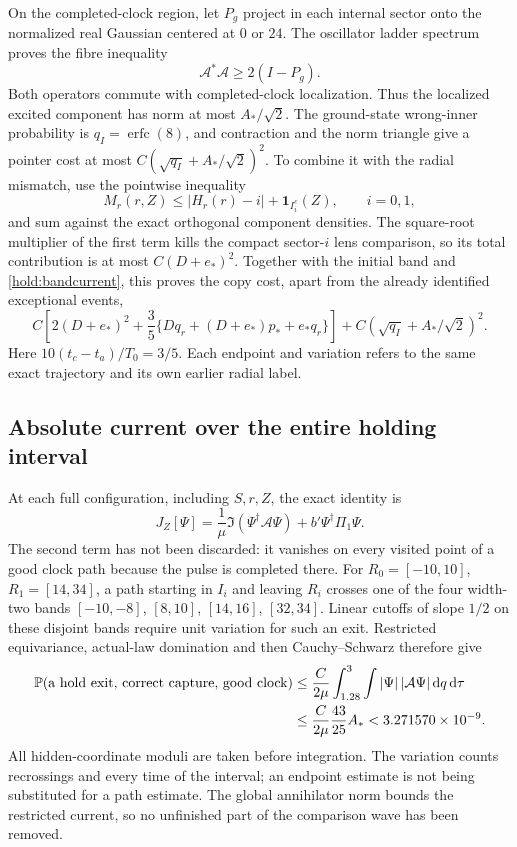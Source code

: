 \documentclass[11pt]{article}
\theoremstyle{definition}\newtheorem{definition}[theorem]{Definition}
\theoremstyle{remark}\newtheorem{remark}[theorem]{Remark}
\newcommand{\Prob}{\mathbb P}\newcommand{\E}{\mathbb E}
\newcommand{\one}{\mathbf1}\newcommand{\R}{\mathbb R}\newcommand{\T}{\mathbb T}
\newcommand{\dd}{\,\mathrm d}\newcommand{\Imv}{\operatorname{Im}}\newcommand{\ii}{\mathrm i}
\begin{document}
On the completed-clock region, let $P_g$ project in each internal
sector onto the normalized real Gaussian centered at $0$ or $24$.
The oscillator ladder spectrum proves the fibre inequality
\begin{equation}\label{hold:gap}
 \mathcal A^*\mathcal A\geq2(I-P_g).
\end{equation}
Both operators commute with completed-clock localization.  Thus the
localized excited component has norm at most $A_*/\sqrt2$.
The ground-state wrong-inner probability is $q_I=\operatorname{erfc}(8)$,
and contraction and the norm triangle give a pointer cost at most
$C(\sqrt{q_I}+A_*/\sqrt2)^2$.
To combine it with the radial mismatch, use the pointwise inequality
\[
 M_r(r,Z)\leq |H_r(r)-i|+\one_{I_i^c}(Z),\qquad i=0,1,
\]
and sum against the exact orthogonal component densities.
The square-root multiplier of the first term kills the compact
sector-$i$ lens comparison, so its total contribution is at most
$C(D+e_*)^2$.  Together with the initial band and
\eqref{hold:bandcurrent}, this proves the copy cost, apart from the
already identified exceptional events,
\begin{equation}\label{hold:copycost}
 C\left[2(D+e_*)^2+\frac35
       \{Dq_r+(D+e_*)p_*+e_*q_r\}\right]
       +C(\sqrt{q_I}+A_*/\sqrt2)^2.
\end{equation}
Here $10(t_c-t_a)/T_0=3/5$.  Each endpoint and variation refers to
the same exact trajectory and its own earlier radial label.

\subsection{Absolute current over the entire holding interval}
\label{hold:retention}
At each full configuration, including $S,r,Z$, the exact identity is
\begin{equation}\label{hold:exactcurrent}
 J_Z[\Psi]=\frac{1}{\mu}\Im(\Psi^\dagger\mathcal A\Psi)
                         +b'\Psi^\dagger\Pi_1\Psi.
\end{equation}
The second term has not been discarded: it vanishes on every visited
point of a good clock path because the pulse is completed there.
For $R_0=[-10,10]$, $R_1=[14,34]$, a path starting in $I_i$ and
leaving $R_i$ crosses one of the four width-two bands
$[-10,-8]$, $[8,10]$, $[14,16]$, $[32,34]$.
Linear cutoffs of slope $1/2$ on these disjoint bands require unit
variation for such an exit.  Restricted equivariance, actual-law
domination and then Cauchy--Schwarz therefore give
\begin{align}
 \Prob(\hbox{a hold exit, correct capture, good clock})
 &\leq\frac{C}{2\mu}\int_{1.28}^{3}
          \int|\Psi|\,|\mathcal A\Psi|\dd q\dd\tau\notag\\
 &\leq\frac{C}{2\mu}\frac{43}{25}A_*
  <3.271570\times10^{-9}.
 \label{hold:wholehold}
\end{align}
All hidden-coordinate moduli are taken before integration.  The
variation counts recrossings and every time of the interval; an
endpoint estimate is not being substituted for a path estimate.
The global annihilator norm bounds the restricted current, so no
unfinished part of the comparison wave has been removed.
\end{document}
